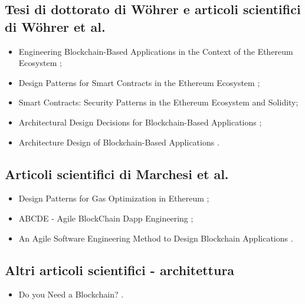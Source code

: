 \subsection*{Tesi di dottorato di Wöhrer e articoli scientifici di Wöhrer et al.}
\begin{itemize}

\item Engineering Blockchain-Based Applications in the Context of the Ethereum Ecosystem \cite{wohrer2022thesis};

\item Design Patterns for Smart Contracts in the Ethereum Ecosystem \cite{wohrer2018designpatterns};

\item Smart Contracts: Security Patterns in the Ethereum Ecosystem and Solidity\cite{wohrer2018securitypatterns};

\item Architectural Design Decisions for Blockchain-Based Applications \cite{wohrer2021decisions};

\item Architecture Design of Blockchain-Based Applications \cite{wohrer2021architecture}.

\end{itemize}

\subsection*{Articoli scientifici di Marchesi et al.}
\begin{itemize}

\item Design Patterns for Gas Optimization in Ethereum \cite{marchesi2020gas};

\item ABCDE - Agile BlockChain Dapp Engineering \cite{marchesi2020agile};

\item An Agile Software Engineering Method to Design Blockchain Applications \cite{marchesi2018agile}.

\end{itemize}

\subsection*{Altri articoli scientifici - architettura}
\begin{itemize}

\item Do you Need a Blockchain? \cite{wurst2018blockchain}.

\end{itemize}

